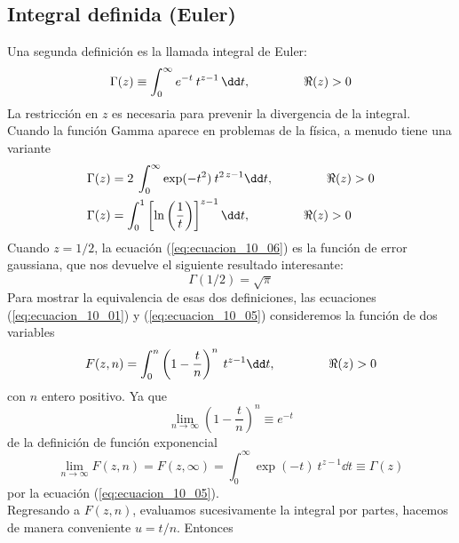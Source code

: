 \subsection{Integral definida (Euler)}
Una segunda definición es la llamada integral de Euler:
\begin{equation}
\Gamma (z) \equiv \int_{0}^{\infty} e^{-t} \: t^{z - 1} \, \dd t, \hspace{1.5cm} \Re(z) > 0
\label{eq:ecuacion_10_05}
\end{equation}
La restricción en $z$ es necesaria para prevenir la divergencia de la integral. Cuando la función Gamma aparece en problemas de la física, a menudo tiene una variante
\begin{align}
\Gamma (z) &= 2 \: \int_{0}^{\infty} \exp(-t^{2}) \: t^{2 \, z - 1} \dd t, \hspace{1.5cm} \Re(z) > 0  \label{eq:ecuacion_10_06} \\
\Gamma (z) &=  \int_{0}^{1} \left[ \ln\left(\dfrac{1}{t} \right) \right]^{z - 1} \dd t, \hspace{1.5cm} \Re (z) > 0 \label{eq:ecuacion_10_07}
\end{align}
Cuando $z=1/2$, la ecuación (\ref{eq:ecuacion_10_06}) es la función de error gaussiana, que nos devuelve el siguiente resultado interesante:
\begin{equation}
\Gamma (1/2) = \sqrt{\pi}
\label{eq:ecuacion_10_08}
\end{equation}
Para mostrar la equivalencia de esas dos definiciones, las ecuaciones (\ref{eq:ecuacion_10_01}) y (\ref{eq:ecuacion_10_05}) consideremos la función de dos variables
\begin{equation}
F(z, n) = \int_{0}^{n} \left( 1 - \dfrac{t}{n} \right)^{n} \: t^{z - 1} \dd t, \hspace{1.5cm} \Re(z) > 0
\label{eq:ecuacion_10_09}
\end{equation}
con $n$ entero positivo. Ya que
\begin{equation}
\lim_{n \to \infty} \left( 1 - \dfrac{t}{n} \right)^{n} \equiv e^{-t}
\label{eq:ecuacion_10_10}
\end{equation}
de la definición de función exponencial
\begin{equation}
\lim_{n \to \infty} F(z, n) = F(z, \infty) = \int_{0}^{\infty} \exp(-t) \: t^{z - 1} \dd t \equiv \Gamma (z)
\label{eq:ecuacione_10_11}
\end{equation}
por la ecuación (\ref{eq:ecuacion_10_05}).
\\
Regresando a $F(z,n)$, evaluamos sucesivamente la integral por partes, hacemos de manera conveniente $u = t/n$. Entonces
